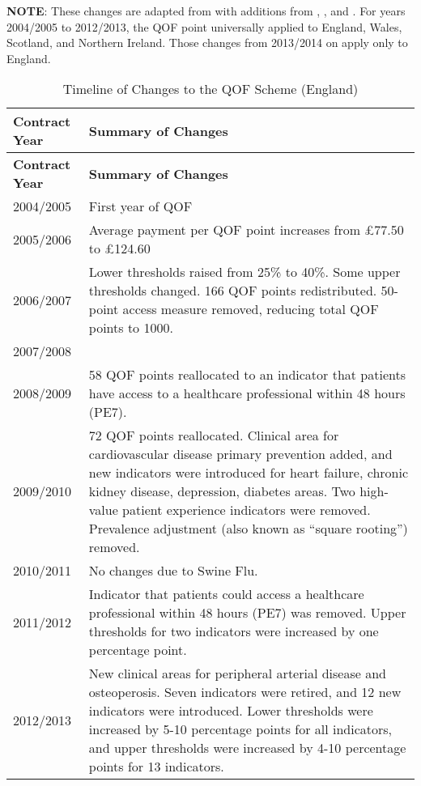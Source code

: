 \documentclass[12pt]{article}
\begin{document}
\begin{ThreePartTable}
  \singlespacing
  \begin{TableNotes}[flushleft]
    \small
    \textbf{NOTE}: These changes are adapted from \citet{instituteofhealthcaremanagementFocusGPQuality2018} with additions from \citet{doranSettingPerformanceTargets2014}, \citet{stokesQOFChangesAre2014}, and \citet{nationalhealthserviceQualityOutcomesFramework2014}. For years 2004/2005 to 2012/2013, the QOF point universally applied to England, Wales, Scotland, and Northern Ireland. Those changes from 2013/2014 on apply only to England.
  \end{TableNotes}
  \begin{longtable}[c]{|p{}|p{}|}
    \caption{Timeline of Changes to the QOF Scheme (England)}
    \label{QOFEnglandChangesTimeline}
    \hline
    \textbf{Contract Year} & \textbf{Summary of Changes} \\
    \hline
    \endfirsthead
    \hline
    \textbf{Contract Year} & \textbf{Summary of Changes} \\
    \hline
    \endhead
    2004/2005 & First year of QOF\\ \hline
    2005/2006 & Average payment per QOF point increases from £77.50 to £124.60 \\ \hline
    2006/2007 & Lower thresholds raised from 25\% to 40\%. Some upper thresholds changed. 166 QOF points redistributed. 50-point access measure removed, reducing total QOF points to 1000.\\ \hline
    2007/2008 & \\ \hline
    2008/2009 & 58 QOF points reallocated to an indicator that patients have access to a healthcare professional within 48 hours (PE7). \\ \hline
    2009/2010 & 72 QOF points reallocated. Clinical area for cardiovascular disease primary prevention added, and new indicators were introduced for heart failure, chronic kidney disease, depression, diabetes areas. Two high-value patient experience indicators were removed. Prevalence adjustment (also known as ``square rooting'') removed. \\ \hline
    2010/2011 & No changes due to Swine Flu. \\ \hline
    2011/2012 & Indicator that patients could access a healthcare professional within 48 hours (PE7) was removed. Upper thresholds for two indicators were increased by one percentage point. \\ \hline
    2012/2013 & New clinical areas for peripheral arterial disease and osteoperosis. Seven indicators were retired, and 12 new indicators were introduced. Lower thresholds were increased by 5-10 percentage points for all indicators, and upper thresholds were increased by 4-10 percentage points for 13 indicators.\\ \hline

\end{longtable}
\end{ThreePartTable}
\end{document}
